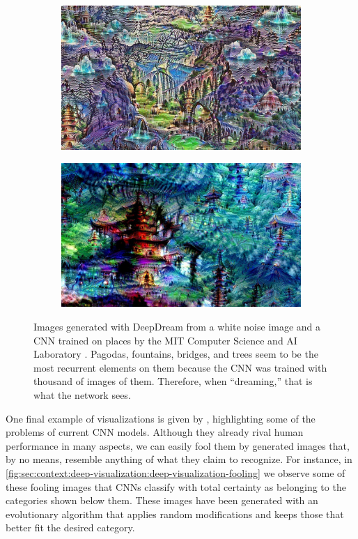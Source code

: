 \begin{figure}[htbp]
  \begin{subfigure}[b]{\textwidth}
    \includegraphics[width=\textwidth]{gfx/dream-buildings-1}
  \end{subfigure}
  \begin{subfigure}[b]{\textwidth}
    \includegraphics[width=\textwidth]{gfx/dream-buildings-2}
  \end{subfigure}
  \caption{
    Images generated with DeepDream from a white noise image and a CNN trained on places by the MIT Computer Science and AI Laboratory \cite{Mordvintsev2015}.
    Pagodas, fountains, bridges, and trees seem to be the most recurrent elements on them because the CNN was trained with thousand of images of them.
    Therefore, when ``dreaming,'' that is what the network sees.
  }
  \label{fig:sec:context:deep-visualization:dream-buildings}
\end{figure}

One final example of visualizations is given by \citet{Nguyen2014}, highlighting some of the problems of current CNN models.
Although they already rival human performance in many aspects, we can easily fool them by generated images that, by no means, resemble anything of what they claim to recognize.
For instance, in \autoref{fig:sec:context:deep-visualization:deep-visualization-fooling} we observe some of these fooling images that CNNs classify with total certainty as belonging to the categories shown below them.
These images have been generated with an evolutionary algorithm that applies random modifications and keeps those that better fit the desired category.

